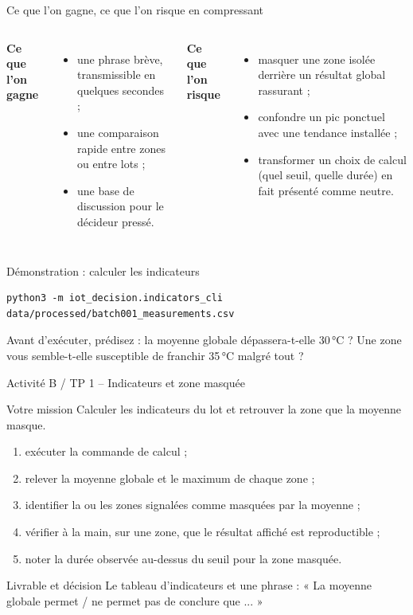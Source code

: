 \documentclass[aspectratio=169]{beamer}
\begin{document}
\begin{frame}{Ce que l'on gagne, ce que l'on risque en compressant}
  \begin{columns}[T]
    \textbf{Ce que l'on gagne}
    \begin{itemize}
      \item une phrase brève, transmissible en quelques secondes ;
      \item une comparaison rapide entre zones ou entre lots ;
      \item une base de discussion pour le décideur pressé.
    \end{itemize}
    \textbf{Ce que l'on risque}
    \begin{itemize}
      \item masquer une zone isolée derrière un résultat global rassurant ;
      \item confondre un pic ponctuel avec une tendance installée ;
      \item transformer un choix de calcul (quel seuil, quelle durée) en fait présenté comme neutre.
    \end{itemize}
  \end{columns}
\end{frame}

\begin{frame}[fragile]{Démonstration : calculer les indicateurs}
  \scriptsize
  \begin{verbatim}
python3 -m iot_decision.indicators_cli data/processed/batch001_measurements.csv
  \end{verbatim}
  \normalsize
  Avant d'exécuter, prédisez : la moyenne globale dépassera-t-elle 30\,°C ? Une zone vous semble-t-elle susceptible de franchir 35\,°C malgré tout ?
\end{frame}

\begin{frame}{Activité B / TP 1 -- Indicateurs et zone masquée}
  \begin{block}{Votre mission}
    Calculer les indicateurs du lot et retrouver la zone que la moyenne masque.
  \end{block}
  \begin{enumerate}
    \item exécuter la commande de calcul ;
    \item relever la moyenne globale et le maximum de chaque zone ;
    \item identifier la ou les zones signalées comme masquées par la moyenne ;
    \item vérifier à la main, sur une zone, que le résultat affiché est reproductible ;
    \item noter la durée observée au-dessus du seuil pour la zone masquée.
  \end{enumerate}
  \begin{block}{Livrable et décision}
    Le tableau d'indicateurs et une phrase : « La moyenne globale permet / ne permet pas de conclure que ... »
  \end{block}
\end{frame}
\end{document}
